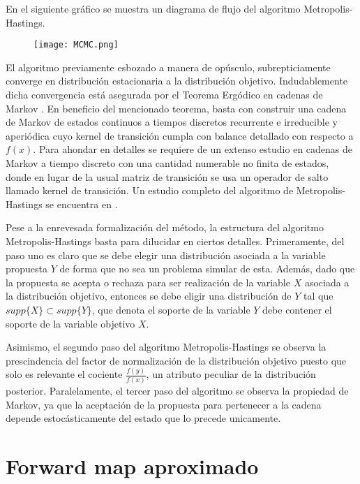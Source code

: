 En el siguiente gráfico se muestra un diagrama de flujo del algoritmo Metropolis-Hastings.

\begin{figure}[H] 
    \centering 
    \texttt{[image: MCMC.png]} 
    \label{Fig. M-H}
\end{figure} 

El algoritmo previamente esbozado a manera de opúsculo, subrepticiamente converge en distribución estacionaria a la distribución objetivo. Indudablemente dicha convergencia está asegurada por el Teorema Ergódico en cadenas de Markov \cite{norris1998markov}. En beneficio del mencionado teorema, basta con construir una cadena de Markov de estados continuos a tiempos discretos recurrente e irreducible y aperiódica cuyo kernel de transición cumpla con balance detallado con respecto a $f(x)$. Para ahondar en detalles se requiere de un extenso estudio en cadenas de Markov a tiempo discreto con una cantidad numerable no finita de estados, donde en lugar de la usual matriz de transición se usa un operador de salto llamado kernel de transición. Un estudio completo del algoritmo de Metropolis-Hastings se encuentra en \cite{mengersen1996rates}.

Pese a la enrevesada formalización del método, la estructura del algoritmo Metropolis-Hastings basta para dilucidar en ciertos detalles. Primeramente, del paso uno es claro que se debe elegir una distribución asociada a la variable propuesta $Y$ de forma que no sea un problema simular de esta. Además, dado que la propuesta se acepta o rechaza para ser realización de la variable $X$ asociada a la distribución objetivo, entonces se debe eligir una distribución de $Y$ tal que $supp\{X\} \subset supp\{Y\}$, que denota el soporte de la variable $Y$ debe contener el soporte de la variable objetivo $X$.

Asimismo, el segundo paso del algoritmo Metropolis-Hastings se observa la prescindencia del factor de normalización de la distribución objetivo puesto que solo es relevante el cociente $\frac{f(y)}{f(x)}$, un atributo peculiar de la distribución posterior. Paralelamente, el tercer paso del algoritmo se observa la propiedad de Markov, ya que la aceptación de la propuesta para pertenecer a la cadena depende estocásticamente del estado que lo precede unicamente.

\section{Forward map aproximado}

